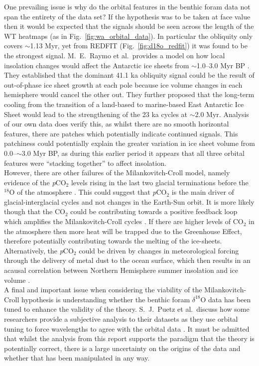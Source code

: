 \documentclass[12pt, onecolumn]{revtex4}    %
\begin{document}
One prevailing issue is why do the orbital features in the benthic foram data not span the entirety of the data set? If the hypothesis was to be taken at face value then it would be expected that the signals should be seen across the length of the WT heatmaps (as in Fig.~\ref{fig:wa_orbital_data}). In particular the obliquity only covers $\sim$1.13 Myr, yet from REDFIT (Fig.~\ref{fig:d18o_redfit}) it was found to be the strongest signal. M.~E.~Raymo et al.~provides a model on how local insolation changes would affect the Antarctic ice sheets from $\sim$1.0--3.0 Myr BP \cite{raymo_plio}. They established that the dominant 41.1 ka obliquity signal could be the result of out-of-phase ice sheet growth at each pole because ice volume changes in each hemisphere would cancel the other out. They further proposed that the long-term cooling from the transition of a land-based to marine-based East Antarctic Ice Sheet would lead to the strengthening of the 23 ka cycles at $\sim$2.0 Myr. Analysis of our own data does verify this, as whilst there are no smooth horizontal features, there are patches which potentially indicate continued signals. This patchiness could potentially explain the greater variation in ice sheet volume from 0.0--$\sim$3.0 Myr BP, as during this earlier period it appears that all three orbital features were ``stacking together'' to affect insolation. \\ 

However, there are other failures of the Milankovitch-Croll model, namely evidence of the \textit{p}CO$_{2}$ levels rising in the last two glacial terminations before the $^{18}$O of the atmosphere \cite{sowers_climate, broecker_terminationii}. This could suggest that \textit{p}CO$_{2}$ is the main driver of glacial-interglacial cycles and not changes in the Earth-Sun orbit. It is more likely though that the CO$_{2}$ could be contributing towards a positive feedback loop which amplifies the Milankovitch-Croll cycles \cite{sigman_atmosphere}. If there are higher levels of CO$_{2}$ in the atmosphere then more heat will be trapped due to the Greenhouse Effect, therefore potentially contributing towards the melting of the ice-sheets. Alternatively, the \textit{p}CO$_{2}$ could be driven by changes in meteorological forcing through the delivery of metal dust to the ocean surface, which then results in an acausal correlation between Northern Hemisphere summer insolation and ice volume \cite{archer_pco2}. \\

A final and important issue when considering the viability of the Milankovitch-Croll hypothesis is understanding whether the benthic foram $\delta^{18}$O data has been tuned to enhance the validity of the theory. S.~J.~Puetz et al.~discuss how some researchers provide a subjective analysis to their datasets as they use orbital tuning to force wavelengths to agree with the orbital data \cite{puetz_alternatives}. It must be admitted that whilst the analysis from this report supports the paradigm that the theory is potentially correct, there is a large uncertainty on the origins of the data and whether that has been manipulated in any way. \\
\end{document}
